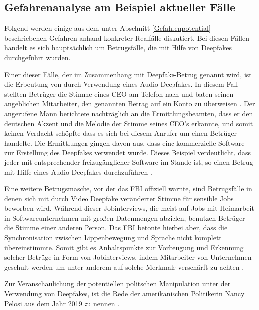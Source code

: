 \subsection{Gefahrenanalyse am Beispiel aktueller Fälle}\label{GefahrenAktuelleFaelle}
Folgend werden einige aus dem unter Abschnitt \ref{Gefahrenpotential} beschriebenen Gefahren anhand konkreter Realfälle diskutiert. 
Bei diesen Fällen handelt es sich hauptsächlich um Betrugsfälle, die mit Hilfe von Deepfakes durchgeführt wurden.
\par
Einer dieser Fälle, der im Zusammenhang mit Deepfake-Betrug genannt wird, ist die Erbeutung von  durch Verwendung eines Audio-Deepfakes.
In diesem Fall stellten Betrüger die Stimme eines CEO am Telefon nach und baten seinen angeblichen Mitarbeiter, den genannten Betrag auf ein Konto zu überweisen \citep[][]{Stupp2019}. 
Der angerufene Mann berichtete nachträglich an die Ermittlungsbeamten, dass er den deutschen Akzent und die Melodie der Stimme seines CEO's erkannte, und somit keinen Verdacht schöpfte dass es sich bei diesem Anrufer um einen Betrüger handelte.
Die Ermittlungen gingen davon aus, dass eine kommerzielle Software zur Erstellung des Deepfakes verwendet wurde.
Dieses Beispiel verdeutlicht, dass jeder mit entsprechender freizugänglicher Software im Stande ist, so einen Betrug mit Hilfe eines Audio-Deepfakes durchzuführen \citep[Vgl.][]{Stupp2019}. 
\par
Eine weitere Betrugsmasche, vor der das FBI offiziell warnte, sind Betrugsfälle in denen sich mit durch Video Deepfake veränderter Stimme für sensible Jobs beworben wird.
Während dieser Jobinterviews, die meist auf Jobs mit Heimarbeit in Softwareunternehmen mit großen Datenmengen abzielen, benutzen Betrüger die Stimme einer anderen Person.
Das FBI betonte hierbei aber, dass die Synchronisation zwischen Lippenbewegung und Sprache nicht komplett übereinstimmte.
Somit gibt es Anhaltspunkte zur Vorbeugung und Erkennung solcher Betrüge in Form von Jobinterviews, indem Mitarbeiter von Unternehmen geschult werden um unter anderem auf solche Merkmale verschärft zu achten \citep[][]{Ferraro2022}. 
\par
Zur Veranschaulichung der potentiellen politschen Manipulation unter der Verwendung von Deepfakes, ist die Rede der amerikanischen Politikerin Nancy Pelosi aus dem Jahr 2019 zu nennen \citep[Vgl.][]{Mervosh2019}.
